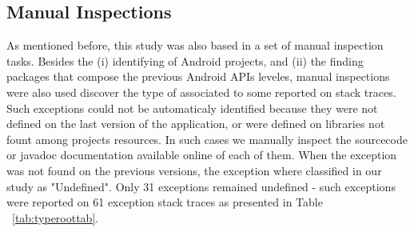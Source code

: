 \documentclass[conference]{IEEEtran}
\begin{document}


\subsection{Manual Inspections}
As mentioned before, this study was also based in a set of manual inspection tasks. Besides the 
 (i) identifying of Android projects, and (ii) the finding packages that compose the 
previous Android APIs leveles, manual inspections were also used discover the type of associated to some 
reported on stack traces. Such exceptions could not be automaticaly identified 
because they were not defined on the last version of the application,
or were defined on libraries not fount among projects resources.
In such cases we manually inspect the sourcecode or javadoc
 documentation available online of each of them. 
When the exception was not found on the previous versions, the exception where classified 
in our study as "Undefined".  Only 31 exceptions 
remained undefined - such exceptions were reported on 61 exception stack traces as 
presented in Table ~\ref{tab:typeroottab}.
\end{document}
